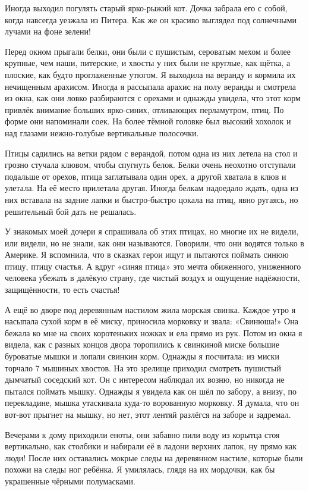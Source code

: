 Иногда выходил погулять старый ярко-рыжий кот.
Дочка забрала его с собой, когда навсегда уезжала из Питера.
Как же он красиво выглядел под солнечными лучами на фоне зелени!

Перед окном прыгали белки, они были с пушистым, сероватым мехом и более крупные, чем наши, питерские, и хвосты у них были не круглые, как щётка, а плоские, как будто проглаженные утюгом.
Я выходила на веранду и кормила их нечищенным арахисом.
Иногда я рассыпала арахис на полу веранды и смотрела из окна, как они ловко разбираются с орехами и однажды увидела, что этот корм привлёк внимание больших ярко-синих, отливающих перламутром, птиц.
По форме они напоминали соек.
На более тёмной головке был высокий хохолок и над глазами нежно-голубые вертикальные полосочки.

Птицы садились на ветки рядом с верандой, потом одна из них летела на стол и грозно стучала клювом, чтобы спугнуть белок.
Белки очень неохотно отступали подальше от орехов, птица заглатывала один орех, а другой хватала в клюв и улетала.
На её место прилетала другая.
Иногда белкам надоедало ждать, одна из них вставала на задние лапки и быстро-быстро цокала на птиц, явно ругаясь, но решительный бой дать не решалась.

У знакомых моей дочери я спрашивала об этих птицах, но многие их не видели, или видели, но не знали, как они называются.
Говорили, что они водятся только в Америке.
Я вспомнила, что в сказках герои ищут и пытаются поймать синюю птицу, птицу счастья.
А вдруг «синяя птица» это мечта обиженного, униженного человека убежать в далёкую страну, где чистый воздух и ощущение надёжности, защищённости, то есть счастья!

А ещё во дворе под деревянным настилом жила морская свинка.
Каждое утро я насыпала сухой корм в её миску, приносила морковку и звала:
«Свинюша!»
Она бежала ко мне на своих коротеньких ножках и ела прямо из рук.
Потом из окна я видела, как с разных концов двора торопились к свинкиной миске большие буроватые мышки и лопали свинкин корм.
Однажды я посчитала: из миски торчало 7 мышиных хвостов.
На это зрелище приходил смотреть пушистый дымчатый соседский кот.
Он с интересом наблюдал их возню, но никогда не пытался поймать мышку.
Однажды я увидела как он шёл по забору, а внизу, по перекладине, мышка утаскивала куда-то ворованную морковку.
Я думала, что он вот-вот прыгнет на мышку, но нет, этот лентяй разлёгся на заборе и задремал.

Вечерами к дому приходили еноты, они забавно пили воду из корытца стоя вертикально, как столбики и набирали её в ладони верхних лапок, ну прямо как люди! После них оставались мокрые следы на деревянном настиле, которые были похожи на следы ног ребёнка.
Я умилялась, глядя на их мордочки, как бы украшенные чёрными полумасками.

